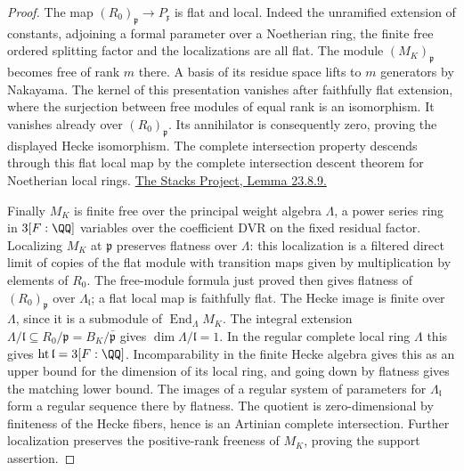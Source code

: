 \documentclass[a4paper,11pt]{article}
\theoremstyle{definition}
\theoremstyle{remark}
\numberwithin{equation}{section}
\begin{document}
\begin{proof}
The map \((R_0)_{\mathfrak p}\to P_{\mathfrak x}\) is flat
and local. Indeed the unramified extension of constants,
adjoining a formal parameter over a Noetherian ring, the
finite free ordered splitting factor and the localizations
are all flat. The module \((M_K)_{\mathfrak p}\) becomes
free of rank \(m\) there. A basis of its residue space lifts
to \(m\) generators by Nakayama. The kernel of this
presentation vanishes after faithfully flat extension, where
the surjection between free modules of equal rank is an
isomorphism. It vanishes already over \((R_0)_{\mathfrak p}\).
Its annihilator is consequently zero, proving the displayed
Hecke isomorphism. The complete intersection property
descends through this flat local map by the complete
intersection descent theorem for Noetherian local rings.
\href{https://stacks.math.columbia.edu/tag/09Q7}
{The Stacks Project, Lemma 23.8.9.}

Finally \(M_K\) is finite free over the principal weight
algebra \(\Lambda\), a power series ring in \(3[F:\QQ]\)
variables over the coefficient DVR on the fixed residual
factor. Localizing \(M_K\) at \(\mathfrak p\) preserves
flatness over \(\Lambda\): this localization is a filtered
direct limit of copies of the flat module with transition
maps given by multiplication by elements of \(R_0\).
The free-module formula just proved then gives flatness of
\((R_0)_{\mathfrak p}\) over \(\Lambda_{\mathfrak l}\);
a flat local map is faithfully flat. The Hecke image is
finite over \(\Lambda\), since it is a submodule of
\(\operatorname{End}_\Lambda M_K\). The integral extension
\(\Lambda/\mathfrak l\subseteq R_0/\mathfrak p
  =B_K/\bar{\mathfrak p}\) gives
\(\dim\Lambda/\mathfrak l=1\). In the regular complete
local ring \(\Lambda\) this gives
\(\operatorname{ht}\mathfrak l=3[F:\QQ]\).
Incomparability in the finite Hecke algebra gives this as
an upper bound for the dimension of its local ring, and
going down by flatness gives the matching lower bound.
The images of a regular system of parameters for
\(\Lambda_{\mathfrak l}\) form a regular sequence there
by flatness. The quotient is zero-dimensional by finiteness
of the Hecke fibers, hence is an Artinian complete
intersection. Further localization preserves the positive-rank
freeness of \(M_K\), proving the support assertion.
\end{proof}
\end{document}
